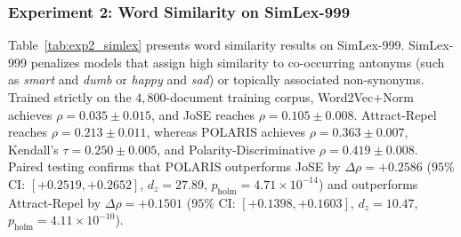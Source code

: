 \documentclass[journal]{IEEEtran}
\begin{document}
\begin{table}[!t]
\centering
\caption{Experiment 2: Word Similarity Evaluation on SimLex-999 Across 10 Seeds (Mean $\pm$ SD, 856 Active Pairs Covered in Vocabulary).}
\label{tab:exp2_simlex}
\end{table}

\subsubsection{Experiment 2: Word Similarity on SimLex-999}
Table~\ref{tab:exp2_simlex} presents word similarity results on SimLex-999. SimLex-999 penalizes models that assign high similarity to co-occurring antonyms (such as \textit{smart} and \textit{dumb} or \textit{happy} and \textit{sad}) or topically associated non-synonyms. Trained strictly on the $4,800$-document training corpus, Word2Vec+Norm achieves $\rho = 0.035 \pm 0.015$, and JoSE reaches $\rho = 0.105 \pm 0.008$. Attract-Repel reaches $\rho = 0.213 \pm 0.011$, whereas POLARIS achieves $\rho = \mathbf{0.363 \pm 0.007}$, Kendall's $\tau = \mathbf{0.250 \pm 0.005}$, and Polarity-Discriminative $\rho = \mathbf{0.419 \pm 0.008}$. Paired testing confirms that POLARIS outperforms JoSE by $\Delta\rho = +0.2586$ ($95\%$ CI: $[+0.2519, +0.2652]$, $d_z = 27.89$, $p_{\text{holm}} = 4.71 \times 10^{-14}$) and outperforms Attract-Repel by $\Delta\rho = +0.1501$ ($95\%$ CI: $[+0.1398, +0.1603]$, $d_z = 10.47$, $p_{\text{holm}} = 4.11 \times 10^{-10}$).
\end{document}
